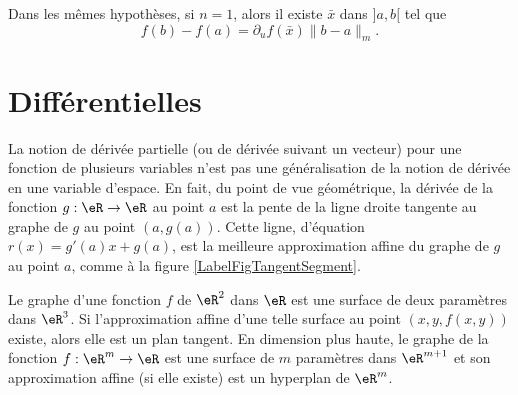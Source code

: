 \begin{corollary}
	Dans les mêmes hypothèses, si $n=1$, alors il existe $\bar x $ dans $]a,b[$ tel que
	\[
		f(b)-f(a)=\partial_uf(\bar x)\|b-a\|_m.
	\]    
\end{corollary}


\section{Différentielles}		\label{SecDifferentielle}
La notion de dérivée partielle (ou de dérivée suivant un vecteur) pour une fonction de plusieurs variables n'est pas une  généralisation de la notion de dérivée en une variable d'espace. En fait, du point de vue géométrique, la dérivée de la fonction $g:\eR\to\eR$ au point $a$ est la pente de la ligne droite tangente au graphe de $g$ au point $(a, g(a))$. Cette ligne, d'équation $r(x)=g'(a)x+g(a)$, est la meilleure approximation affine du graphe de $g$ au point $a$, comme à la figure \ref{LabelFigTangentSegment}.
\newcommand{\CaptionFigTangentSegment}{Tangentes au graphe d'une fonction d'une variable}


Le graphe d'une fonction $f$ de $\eR^2$ dans $\eR$ est une surface de deux paramètres dans $\eR^3$. Si l'approximation affine d'une telle surface au point $(x,y,f(x,y))$ existe, alors elle est un plan tangent. En dimension plus haute, le graphe de la fonction $f:\eR^m\to\eR$ est une surface de $m$ paramètres dans $\eR^{m+1}$ et son approximation affine (si elle existe) est un hyperplan de $\eR^m$. 

